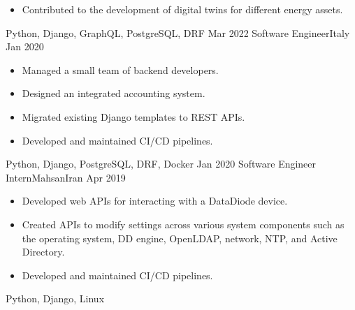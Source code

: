 \begin{experiences}
{\begin{itemize}
      \item Contributed to the development of digital twins for different energy assets.
    \end{itemize}
  }
  {Python, Django, GraphQL, PostgreSQL, DRF}
  \emptySeparator
  \experience
  {Mar 2022} {Software Engineer}{}{Italy}
  {Jan 2020} {
    \begin{itemize}
      \item Managed a small team of backend developers.
      \item Designed an integrated accounting system.
      \item Migrated existing Django templates to REST APIs.
      \item Developed and maintained CI/CD pipelines.
    \end{itemize}
  }
  {Python, Django, PostgreSQL, DRF, Docker}
  \emptySeparator
  \experience
  {Jan 2020} {Software Engineer Intern}{Mahsan}{Iran}
  {Apr 2019} {
    \begin{itemize}
      \item Developed web APIs for interacting with a DataDiode device.
      \item Created APIs to modify settings across various system components such as
      the operating system, DD engine, OpenLDAP, network, NTP, and Active Directory.
      \item Developed and maintained CI/CD pipelines.
    \end{itemize}
  }
  {Python, Django, Linux}
  \emptySeparator
\end{experiences}
